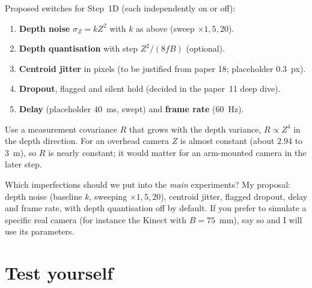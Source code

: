 \documentclass[11pt,a4paper]{article}
\begin{document}
\begin{ours}
Proposed switches for Step~1D (each independently on or off):
\begin{enumerate}
\item \textbf{Depth noise} $\sigma_Z=kZ^2$ with $k$ as above (sweep $\times1,5,20$).
\item \textbf{Depth quantisation} with step $Z^2/(8fB)$ (optional).
\item \textbf{Centroid jitter} in pixels (to be justified from paper 18; placeholder $0.3$~px).
\item \textbf{Dropout}, flagged and silent hold (decided in the paper~11 deep dive).
\item \textbf{Delay} (placeholder $40$~ms, swept) and \textbf{frame rate} ($60$~Hz).
\end{enumerate}
\end{ours}

\begin{ours}
Use a measurement covariance $R$ that grows with the depth variance, $R\propto Z^4$ in the depth
direction. For an overhead camera $Z$ is almost constant (about $2.94$ to $3$~m), so $R$ is nearly
constant; it would matter for an arm-mounted camera in the later step.
\end{ours}

\begin{eqbox}
Which imperfections should we put into the \emph{main} experiments? My proposal: depth noise
(baseline $k$, sweeping $\times1,5,20$), centroid jitter, flagged dropout, delay and frame rate,
with depth quantisation off by default. If you prefer to simulate a specific real camera (for
instance the Kinect with $B=75$~mm), say so and I will use its parameters.
\end{eqbox}

\section{Test yourself}
\end{document}
